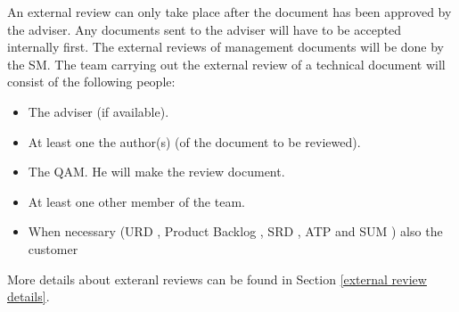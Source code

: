 \documentclass[%
		pathtobase=..,%
		titlefull={Software Validation and Verification Plan},%
		titleabbr=SVVP,%
		version=0.1]{fingerpaint}
\begin{document}
An external review can only take place after the document has been approved by the adviser. Any documents sent to the adviser will have to be accepted internally first. The external reviews of management documents will be done by the SM. The team carrying out the external review of a technical document will consist of the following people:
\begin{itemize}
\item The adviser (if available).
\item At least one the author(s) (of the document to be reviewed).
\item The QAM. He will make the review document.
\item At least one other member of the team.
\item When necessary (URD \cite{urd}, Product Backlog \cite{backlog}, SRD \cite{srd}, ATP \cite{atp} and SUM \cite{sum}) also the customer
\end{itemize}
More details about exteranl reviews can be found in Section \ref{external review details}.
\end{document}
